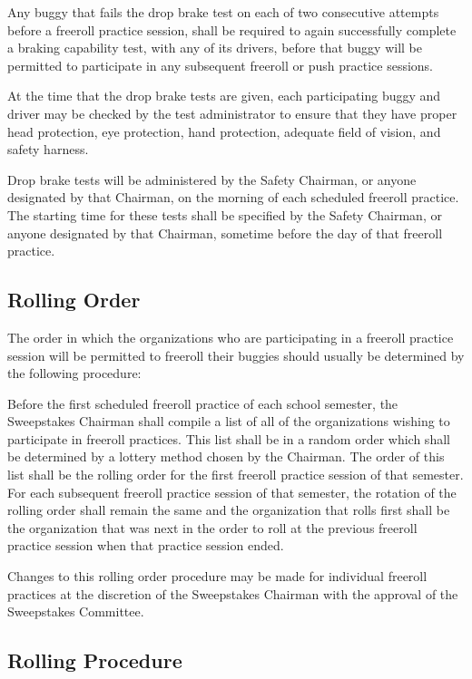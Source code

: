 	Any buggy that fails the drop brake test on each of two consecutive attempts before a freeroll practice session, shall be required to again successfully complete a braking capability test, with any of its drivers, before that buggy will be permitted to participate in any subsequent freeroll or push practice sessions.

	At the time that the drop brake tests are given, each participating buggy and driver may be checked by the test administrator to ensure that they have proper head protection, eye protection, hand protection, adequate field of vision, and safety harness.

	Drop brake tests will be administered by the Safety Chairman, or anyone designated by that Chairman, on the morning of each scheduled freeroll practice. The starting time for these tests shall be specified by the Safety Chairman, or anyone designated by that Chairman, sometime before the day of that freeroll practice.

\subsection{Rolling Order}

	The order in which the organizations who are participating in a freeroll practice session will be permitted to freeroll their buggies should usually be determined by the following procedure:

	Before the first scheduled freeroll practice of each school semester, the Sweepstakes Chairman shall compile a list of all of the organizations wishing to participate in freeroll practices. This list shall be in a random order which shall be determined by a lottery method chosen by the Chairman. The order of this list shall be the rolling order for the first freeroll practice session of that semester. For each subsequent freeroll practice session of that semester, the rotation of the rolling order shall remain the same and the organization that rolls first shall be the organization that was next in the order to roll at the previous freeroll practice session when that practice session ended.

	Changes to this rolling order procedure may be made for individual freeroll practices at the discretion of the Sweepstakes Chairman with the approval of the Sweepstakes Committee.

\subsection{Rolling Procedure}

